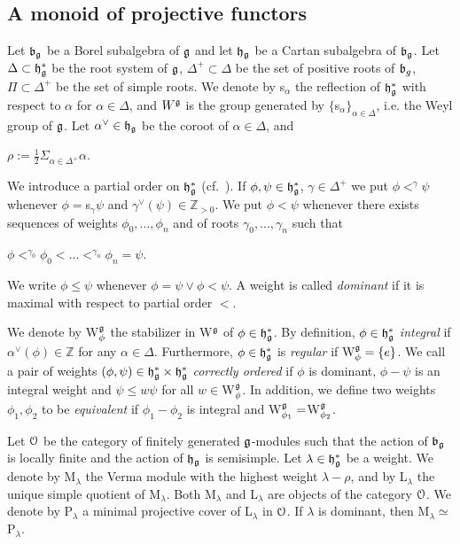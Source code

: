 \documentclass[12pt]{amsart}
\theoremstyle{definition}\newtheorem{theorem}{Theorem}[section]
\theoremstyle{definition}\newtheorem{definition}[proposition]{Definition}
\theoremstyle{remark}\newtheorem{example}[proposition]{Example}
\begin{document}
\subsection{A monoid of projective functors}\label{SSpro} Let $\frak b_\frak g$ be a Borel subalgebra of $\frak g$ and let $\frak h_\frak g$ be a Cartan subalgebra of $\frak b_\frak g$. Let $\Delta\subset \frak h_\frak g^*$ be the root system of $\frak g$, $\Delta^+\subset\Delta$ be the set of positive roots of $\frak b_g$, $\Pi\subset \Delta^+$ be the set of simple roots. We denote by s$_\alpha$ the reflection of $\frak h_\frak g^*$ with respect to $\alpha$ for $\alpha\in\Delta$, and $W^\frak g$ is the group generated by  $\{$s$_\alpha\}_{\alpha\in\Delta}$, i.e. the Weyl group of $\frak g$. Let $\alpha^\vee\in \frak h_\frak g$ be the coroot of $\alpha\in\Delta$, and \begin{center}$\rho:=\frac{1}{2}\Sigma_{\alpha\in\Delta^+}\alpha$.\end{center}

We introduce a partial order on $\frak h_\frak g^*$ (cf.~\cite[1.5]{BeG}). If $\phi, \psi\in\frak h_\frak g^*$, $\gamma\in\Delta^+$ we put $\phi<^\gamma\psi$ whenever $\phi=$s$_\gamma\psi$ and $\gamma^\vee(\psi)\in\mathbb Z_{>0}$. We put $\phi<\psi$ whenever there exists sequences of weights $\phi_0,..., \phi_n$ and of roots $\gamma_0,..., \gamma_n$ such that \begin{center}$\phi<^{\gamma_0}\phi_0<...<^{\gamma_n}\phi_n=\psi$.\end{center} We write $\phi\le \psi$ whenever $\phi=\psi\vee\phi<\psi$. A weight is called {\it dominant} if it is maximal with respect to partial order $<$.

We denote by W$^\frak g_\phi$ the stabilizer in W$^\frak g$ of $\phi\in\frak h_\frak g^*$. By definition, $\phi\in\frak h_\frak g^*$ {\it integral} if $\alpha^\vee(\phi)\in\mathbb Z$ for any $\alpha\in\Delta$. Furthermore, $\phi\in\frak h_\frak g^*$ is {\it regular} if W$^\frak g_\phi=\{e\}$. We call a pair of weights $(\phi, \psi)\in\frak h_\frak g^*\times\frak h_\frak g^*$ {\it correctly ordered} if $\phi$ is dominant, $\phi-\psi$ is an integral weight and $\psi\le w\psi$ for all $w\in$W$^\frak g_\phi$. In addition, we define two weights $\phi_1, \phi_2$ to be {\it equivalent} if $\phi_1-\phi_2$ is integral and W$^\frak g_{\phi_1}=$W$^\frak g_{\phi_2}$.

Let $\EuScript O$ be the category of finitely generated $\frak g$-modules such that the action of $\frak b_\frak g$ is locally finite and the action of $\frak h_\frak g$ is semisimple. Let $\lambda\in\frak h_\frak g^*$ be a weight. We denote by M$_\lambda$ the Verma module with the highest weight $\lambda-\rho$, and by L$_\lambda$ the unique simple quotient of M$_\lambda$. Both M$_\lambda$ and L$_\lambda$ are objects of the category $\EuScript O$. We denote by P$_\lambda$ a minimal projective cover of L$_\lambda$ in $\EuScript O$. If $\lambda$ is dominant, then M$_\lambda\simeq$P$_\lambda$.
\end{document}
